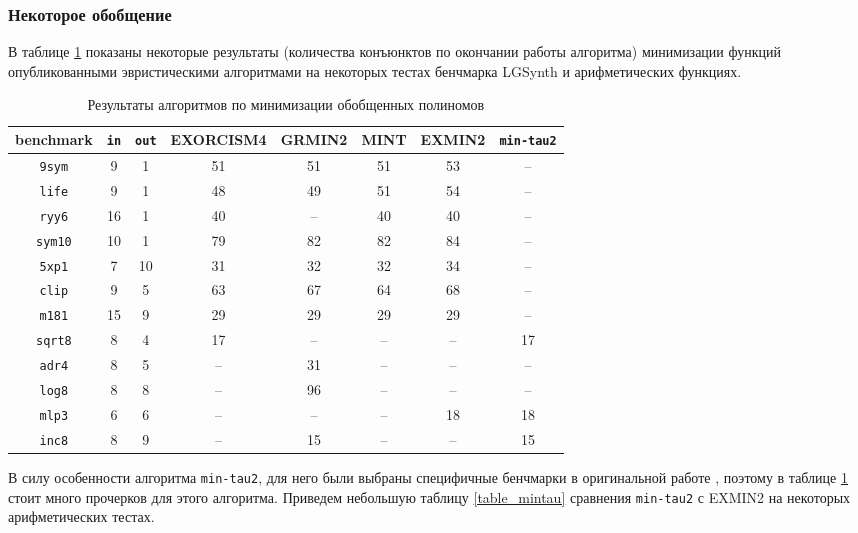 \documentclass[a4paper,12pt,titlepage,finall]{article}
\begin{document}
\subsubsection{Некоторое обобщение}

В таблице \ref{table_benchmark} показаны некоторые результаты (количества конъюнктов по окончании работы алгоритма) минимизации функций опубликованными эвристическими алгоритмами на некоторых тестах бенчмарка LGSynth и арифметических функциях.

\begin{table}[h!]
\centering
\begin{tabular}{ |c||c|c||c|c|c|c|c| }
\hline
\textbf{benchmark} & \texttt{\bf in} & \texttt{\bf out} & \textsc{EXORCISM4} & \textsc{GRMIN2} & \textsc{MINT} & \textsc{EXMIN2} & \texttt{min-tau2} \\
\hline\hline
\texttt{9sym}   & 9  & 1  & 51 & 51 & 51 & 53 & – \\
\hline
\texttt{life}   & 9  & 1  & 48 & 49 & 51 & 54 & – \\
\hline
\texttt{ryy6}   & 16 & 1  & 40 & –  & 40 & 40 & – \\
\hline
\texttt{sym10}  & 10 & 1  & 79 & 82 & 82 & 84 & – \\
\hline\hline
\texttt{5xp1}   & 7  & 10 & 31 & 32 & 32 & 34 & – \\
\hline
\texttt{clip}   & 9  & 5  & 63 & 67 & 64 & 68 & – \\
\hline
\texttt{m181}   & 15 & 9  & 29 & 29 & 29 & 29 & – \\
\hline
\texttt{sqrt8}  & 8  & 4  & 17 & –  & –  & –  & 17 \\
\hline\hline
\texttt{adr4}   & 8  & 5  & –  & 31 & –  & –  & – \\
\hline
\texttt{log8}   & 8  & 8  & –  & 96 & –  & –  & – \\
\hline
\texttt{mlp3}   & 6  & 6  & –  & –  & –  & 18 & 18 \\
\hline
\texttt{inc8}   & 8  & 9  & –  & 15 & –  & –  & 15 \\
\hline
\end{tabular}
\caption{Результаты алгоритмов по минимизации обобщенных полиномов}
\label{table_benchmark}
\end{table}

В силу особенности алгоритма \texttt{min-tau2}, для него были выбраны специфичные бенчмарки в оригинальной работе \cite{min-tau2}, поэтому в таблице \ref{table_benchmark} стоит много прочерков для этого алгоритма. Приведем небольшую таблицу \ref{table_mintau} сравнения \texttt{min-tau2} с \textsc{EXMIN2} на некоторых арифметических тестах.
\end{document}
